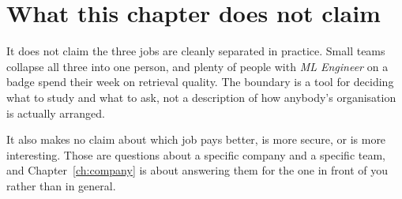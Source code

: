 \section*{What this chapter does not claim}

It does not claim the three jobs are cleanly separated in practice. Small teams
collapse all three into one person, and plenty of people with \emph{ML
Engineer} on a badge spend their week on retrieval quality. The boundary is a
tool for deciding what to study and what to ask, not a description of how
anybody's organisation is actually arranged.

It also makes no claim about which job pays better, is more secure, or is more
interesting. Those are questions about a specific company and a specific team,
and Chapter~\ref{ch:company} is about answering them for the one in front of
you rather than in general.
